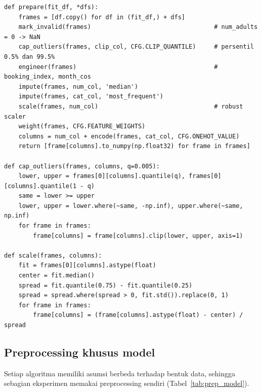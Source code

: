 \begin{lstlisting}[caption={Pipeline preprocessing bersama (\texttt{src/main.ipynb})}, label={lst:prepare}]
def prepare(fit_df, *dfs):
    frames = [df.copy() for df in (fit_df,) + dfs]
    mark_invalid(frames)                                  # num_adults = 0 -> NaN
    cap_outliers(frames, clip_col, CFG.CLIP_QUANTILE)     # persentil 0.5% dan 99.5%
    engineer(frames)                                      # booking_index, month_cos
    impute(frames, num_col, 'median')
    impute(frames, cat_col, 'most_frequent')
    scale(frames, num_col)                                # robust scaler
    weight(frames, CFG.FEATURE_WEIGHTS)
    columns = num_col + encode(frames, cat_col, CFG.ONEHOT_VALUE)
    return [frame[columns].to_numpy(np.float32) for frame in frames]

def cap_outliers(frames, columns, q=0.005):
    lower, upper = frames[0][columns].quantile(q), frames[0][columns].quantile(1 - q)
    same = lower >= upper
    lower, upper = lower.where(~same, -np.inf), upper.where(~same, np.inf)
    for frame in frames:
        frame[columns] = frame[columns].clip(lower, upper, axis=1)

def scale(frames, columns):
    fit = frames[0][columns].astype(float)
    center = fit.median()
    spread = fit.quantile(0.75) - fit.quantile(0.25)
    spread = spread.where(spread > 0, fit.std()).replace(0, 1)
    for frame in frames:
        frame[columns] = (frame[columns].astype(float) - center) / spread
\end{lstlisting}

\subsection{Preprocessing khusus model}
Setiap algoritma memiliki asumsi berbeda terhadap bentuk data, sehingga sebagian eksperimen memakai preprocessing sendiri (Tabel~\ref{tab:prep_model}).

